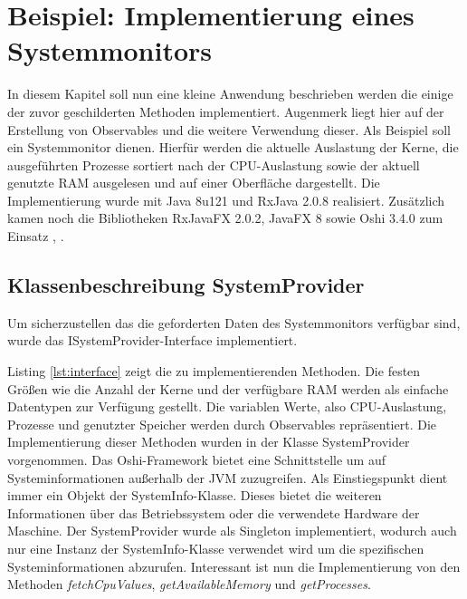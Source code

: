 \chapter{Beispiel: Implementierung eines Systemmonitors}\label{beispiel}
In diesem Kapitel soll nun eine kleine Anwendung beschrieben werden die einige der zuvor geschilderten Methoden implementiert. Augenmerk liegt hier auf der Erstellung von Observables und die weitere Verwendung dieser. Als Beispiel soll ein Systemmonitor dienen. Hierfür werden die aktuelle Auslastung der Kerne, die ausgeführten Prozesse sortiert nach der CPU-Auslastung sowie der aktuell genutzte RAM ausgelesen und auf einer Oberfläche dargestellt. Die Implementierung wurde mit Java 8u121 und RxJava 2.0.8 realisiert. Zusätzlich kamen noch die Bibliotheken RxJavaFX 2.0.2, JavaFX 8 sowie Oshi 3.4.0 zum Einsatz \cite{rxajavafx}, \cite{oshi}.  
\section{Klassenbeschreibung SystemProvider}
Um sicherzustellen das die geforderten Daten des Systemmonitors verfügbar sind, wurde das ISystemProvider-Interface implementiert. 
 
Listing \ref{lst:interface} zeigt die zu implementierenden Methoden. Die festen Größen wie die Anzahl der Kerne und der verfügbare RAM werden als einfache Datentypen zur Verfügung gestellt. Die variablen Werte, also CPU-Auslastung, Prozesse und genutzter Speicher werden durch Observables repräsentiert. Die Implementierung dieser Methoden wurden in der Klasse SystemProvider vorgenommen. Das Oshi-Framework bietet eine Schnittstelle um auf Systeminformationen außerhalb der JVM zuzugreifen. Als Einstiegspunkt dient immer ein Objekt der SystemInfo-Klasse. Dieses bietet die weiteren Informationen über das Betriebssystem oder die verwendete Hardware der Maschine. Der SystemProvider wurde als Singleton implementiert, wodurch auch nur eine Instanz der SystemInfo-Klasse verwendet wird um die spezifischen Systeminformationen abzurufen. Interessant ist nun die Implementierung von den Methoden \textit{fetchCpuValues}, \textit{getAvailableMemory} und \textit{getProcesses}. 
